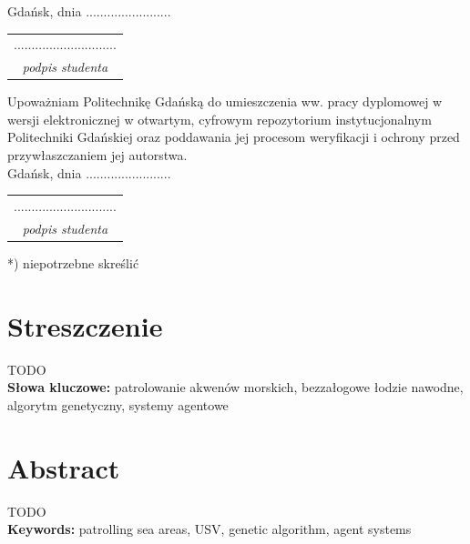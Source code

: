 \documentclass[10pt,a4paper,titlepage,twoside]{report}
\begin{document}
\noindent Gdańsk, dnia  ........................  \hspace{5cm}
\begin{tabular}{c}
	\\
	  .............................\\
	\small \textit{podpis studenta}
\end{tabular}

Upoważniam Politechnikę Gdańską do umieszczenia ww. pracy dyplomowej w wersji elektronicznej w otwartym, cyfrowym repozytorium instytucjonalnym Politechniki Gdańskiej oraz poddawania jej procesom weryfikacji i ochrony przed przywłaszczaniem jej autorstwa.\\
\newline
Gdańsk, dnia  ........................  \hspace{5cm}
\begin{tabular}{c}
	\\
	  .............................\\
	\small \textit{podpis studenta}
\end{tabular}





*) niepotrzebne skreślić




\newpage
{}
\setcounter{page}{1}
\onehalfspacing

\section*{Streszczenie}
\indent  TODO\\

\noindent \textbf{Słowa kluczowe:} patrolowanie akwenów morskich, bezzałogowe łodzie nawodne, algorytm genetyczny, systemy agentowe
 
\newpage
\section*{Abstract}

TODO\\
\newline
\textbf{Keywords:} patrolling sea areas, USV, genetic algorithm, agent systems


\newpage
{}

\tableofcontents
\end{document}
